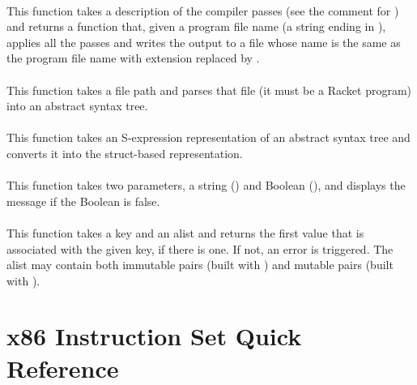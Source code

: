 \documentclass[7x10]{TimesAPriori_MIT}%
\def\racketEd{0}
\numberwithin{theorem}{chapter}
\numberwithin{definition}{chapter}
\numberwithin{equation}{chapter}
\begin{document}
{\paragraph{}

This function takes a description of the compiler passes (see the
comment for ) and returns a function that, given a
program file name (a string ending in ), applies all the
passes and writes the output to a file whose name is the same as the
program file name with extension  replaced by .


\paragraph{}

This function takes a file path and parses that file (it must be a
Racket program) into an abstract syntax tree.

\paragraph{}

This function takes an S-expression representation of an abstract
syntax tree and converts it into the struct-based representation.

\paragraph{}

This function takes two parameters, a string () and Boolean
(), and displays the message  if the Boolean
 is false.

\paragraph{}

This function takes a key and an alist and returns the first value that is
associated with the given key, if there is one. If not, an error is
triggered.  The alist may contain both immutable pairs (built with
) and mutable pairs (built with ).


\fi} %

\section{x86 Instruction Set Quick Reference}
\label{sec:x86-quick-reference}
\end{document}

